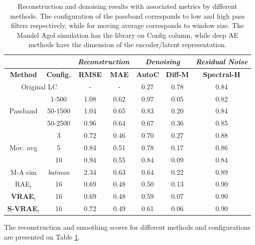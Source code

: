 \begin{table}[!t]
\caption{Reconstruction and denoising results with associated metrics by different methods. The configuration of the passband corresponds to low and high pass filters respectively, while for moving average corresponds to window size. The Mandel Agol simulation has the library on Config column, while deep AE methods have the dimension of the encoder/latent representation.}
\label{tab:rec_results}
\centering
\begin{tabular}{|c|c|cc|cc|c|} \cline{3-7}
\multicolumn{1}{c}{} &         & \multicolumn{2}{c|}{\textit{Reconstruction}} & \multicolumn{2}{c|}{\textit{Denoising}} & \textit{Residual Noise} \\ \hline
\multicolumn{1}{|c|}{\textbf{Method}}  & \textbf{Config.}   & \textbf{RMSE}         & \textbf{MAE}         & \textbf{AutoC}   & \textbf{Diff-M}   & \textbf{Spectral-H}            \\ \hline \hline
\multicolumn{2}{|c|}{Original LC}   & -  &  -   & 0.27                & 0.78              &  0.84    \\ \hline \hline
\multicolumn{1}{|c|}{\multirow{3}{*}{Passband}}  & 1-500  & 1.08  & 0.62   & 0.97  & 0.05  &  0.82 \\ %
     & 50-1500 & 1.04    & 0.65 & 0.83  & 0.20  &   0.84       \\ %
    & 50-2500 & 0.96     & 0.64     & 0.67  & 0.36     &    0.85     \\ \hline
\multicolumn{1}{|c|}{\multirow{3}{*}{Mov. avg}} & 3 & 0.72   & 0.46 & 0.70 & 0.27 &  0.88     \\ %
      & 5       & 0.84   & 0.51  & 0.78  & 0.17    &   0.86            \\ %
   & 10      & 0.94       & 0.55  & 0.84    & 0.09   &  0.84  \\ \hline
M-A sim & \textit{batman}    & 2.34     & 0.63         & 0.64        & 0.22         & 0.89          \\ \hline
RAE$_t$ & 16        & 0.69       & 0.48   & 0.50    & 0.13     &     0.90        \\ \hline
\textbf{VRAE$_t$} & 16  & 0.69     & 0.48  & 0.59  & 0.07     &    0.90               \\ %
\textbf{S-VRAE$_t$}  & 16    & 0.72   & 0.49  & 0.61   & 0.06     &     0.90     \\ \hline
\end{tabular}
\end{table}
The reconstruction and smoothing scores for different methods and configurations are presented on Table \ref{tab:rec_results}.

